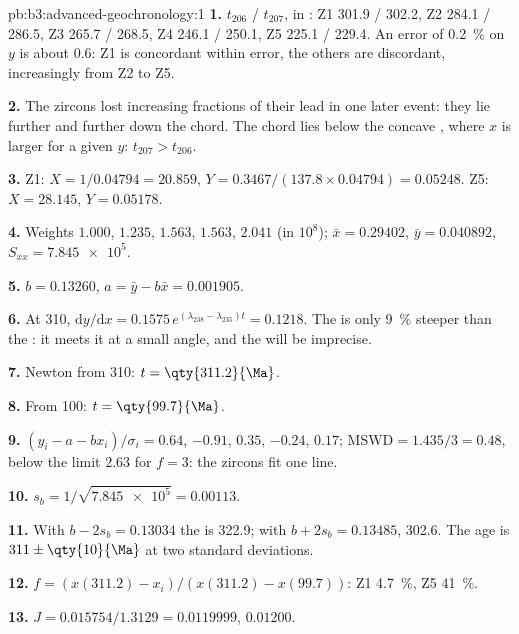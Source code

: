 \begin{solution}{pb:b3:advanced-geochronology:1}
\textbf{1.} $t_{206}$ / $t_{207}$, in \unit{\Ma}: Z1 301.9 / 302.2, Z2 284.1 /
286.5, Z3 265.7 / 268.5, Z4 246.1 / 250.1, Z5 225.1 / 229.4. An error of
\qty{0.2}{\percent} on $y$ is about \qty{0.6}{\Ma}: Z1 is concordant within
error, the others are discordant, increasingly from Z2 to Z5.

\textbf{2.} The zircons lost increasing fractions of their lead in one later
event: they lie further and further down the chord. The chord lies below the
concave , where $x$ is larger for a given $y$: $t_{207} > t_{206}$.

\textbf{3.} Z1: $X = 1/0.04794 = 20.859$, $Y = 0.3467/(137.8\times0.04794) =
0.05248$. Z5: $X = 28.145$, $Y = 0.05178$.

\textbf{4.} Weights $1.000$, $1.235$, $1.563$, $1.563$, $2.041$ (in
$10^8$); $\bar x = 0.29402$, $\bar y = 0.040892$, $S_{xx} = \num{7.845e5}$.

\textbf{5.} $b = 0.13260$, $a = \bar y - b\bar x = 0.001905$.

\textbf{6.} At \qty{310}{\Ma}, $\mathrm dy/\mathrm dx = 0.1575\,
e^{(\lambda_{238} - \lambda_{235})t} = 0.1218$. The  is only
\qty{9}{\percent} steeper than the : it meets it at a small angle,
and the  will be imprecise.

\textbf{7.} Newton from \qty{310}{\Ma}: $t = \qty{311.2}{\Ma}$.

\textbf{8.} From \qty{100}{\Ma}: $t = \qty{99.7}{\Ma}$.

\textbf{9.} $(y_i - a - bx_i)/\sigma_i = 0.64$, $-0.91$, $0.35$, $-0.24$,
$0.17$; $\mathrm{MSWD} = 1.435/3 = 0.48$, below the limit $2.63$ for $f = 3$:
the zircons fit one line.

\textbf{10.} $s_b = 1/\sqrt{\num{7.845e5}} = 0.00113$.

\textbf{11.} With $b - 2s_b = 0.13034$ the  is
\qty{322.9}{\Ma}; with $b + 2s_b = 0.13485$, \qty{302.6}{\Ma}. The age is
$311 \pm \qty{10}{\Ma}$ at two standard deviations.

\textbf{12.} $f = (x(311.2) - x_i)/(x(311.2) - x(99.7))$: Z1 \qty{4.7}{\percent},
Z5 \qty{41}{\percent}.

\textbf{13.} $J = 0.015754/1.3129 = 0.0119999$, $0.01200$.


\end{solution}
